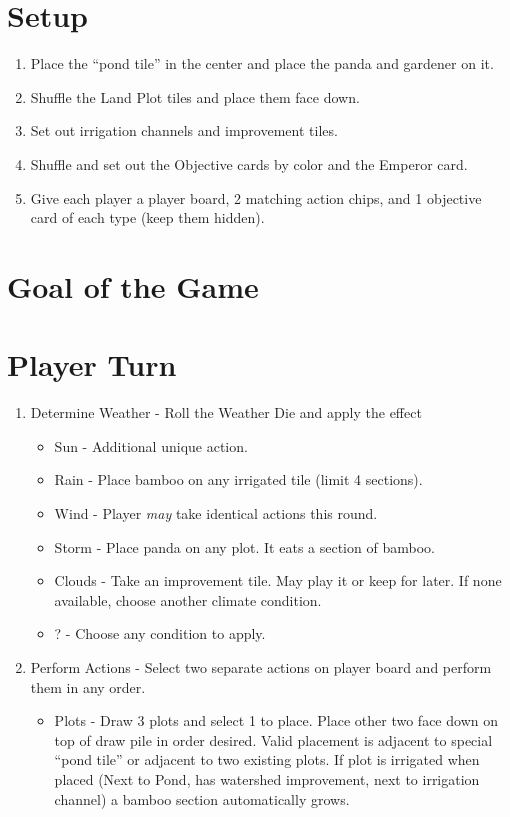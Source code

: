 \documentclass[12pt]{article}
\newenvironment{enumerateCustom}
{\begin{enumerate}
  \setlength{\itemsep}{1pt}
  \setlength{\parskip}{0pt}
  \setlength{\parsep}{0pt}}
{\end{enumerate}}
\newenvironment{itemizeCustom}
{\begin{itemize}
  \setlength{\itemsep}{1pt}
  \setlength{\parskip}{0pt}
  \setlength{\parsep}{0pt}}
{\end{itemize}}
\begin{document}
\begin{mdframed}[style = customFrame]
\begin{multicols*}{2}

\section*{Setup}
\begin{enumerateCustom}
	\item Place the ``pond tile'' in the center and place the panda and gardener on it.
	\item Shuffle the Land Plot tiles and place them face down.
	\item Set out irrigation channels and improvement tiles.
	\item Shuffle and set out the Objective cards by color and the Emperor card.
	\item Give each player a player board, 2 matching action chips, and 1 objective card of each type (keep them hidden).
\end{enumerateCustom}

\section*{Goal of the Game}
\section*{Player Turn}
\begin{enumerateCustom}
	\item Determine Weather - Roll the Weather Die and apply the effect
		\begin{itemizeCustom}
			\item Sun - Additional unique action.
			\item Rain - Place bamboo on any irrigated tile (limit 4 sections).
			\item Wind - Player \emph{may} take identical actions this round.
			\item Storm - Place panda on any plot. It eats a section of bamboo.
			\item Clouds - Take an improvement tile. May play it or keep for later. If none available, choose another climate condition.
			\item ? - Choose any condition to apply.
		\end{itemizeCustom}
	\item Perform Actions - Select two separate actions on player board and perform them in any order.
		\begin{itemizeCustom}
			\item Plots - Draw 3 plots and select 1 to place. Place other two face down on top of draw pile in order desired. Valid placement is adjacent to special ``pond tile'' or adjacent to two existing plots. If plot is irrigated when placed (Next to Pond, has watershed improvement, next to irrigation channel) a bamboo section automatically grows.
		\end{itemizeCustom}
\end{enumerateCustom}

\end{multicols*}
\end{mdframed}
\end{document}
